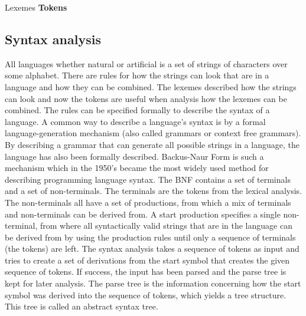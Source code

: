 
		    {               }
{Lexemes   }{\textbf{Tokens}}{
}

\subsection{Syntax analysis}
All languages whether natural or artificial is a set of strings of characters over some alphabet. There are rules for how the strings can look that are in a language and how they can be combined. The lexemes described how the strings can look and now the tokens are useful when analysis how the lexemes can be combined. The rules can be specified formally to describe the syntax of a language\cite[p. 135]{sebesta2013}. A common way to describe a language's syntax is by a formal language-generation mechanism (also called grammars or context free grammars). By describing a grammar that can generate all possible strings in a language, the language has also been formally described. Backus-Naur Form is such a mechanism which in the 1950's became the most widely used method for describing programming language syntax\cite[p. 137]{sebesta2013}.
The BNF contains a set of terminals and a set of non-terminals. The terminals are the tokens from the lexical analysis. The non-terminals all have a set of productions, from which a mix of terminals and non-terminals can be derived from. A start production specifies a single non-terminal, from where all syntactically valid strings that are in the language can be derived from by using the production rules until only a sequence of terminals (the tokens) are left. The syntax analysis takes a sequence of tokens as input and tries to create a set of derivations from the start symbol that creates the given sequence of tokens. If success, the input has been parsed and the parse tree is kept for later analysis. The parse tree is the information concerning how the start symbol was derived into the sequence of tokens, which yields a tree structure. This tree is called an abstract syntax tree.

